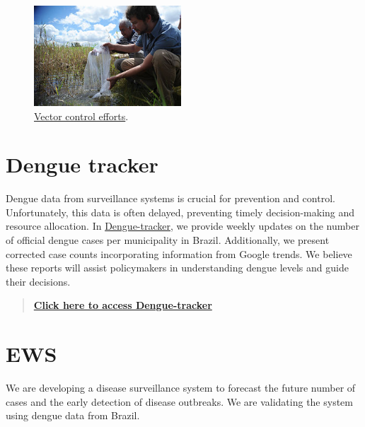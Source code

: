 \documentclass[
  letterpaper,
  DIV=11,
  numbers=noendperiod]{scrreprt}
\begin{document}
\begin{figure}

{\centering \includegraphics[width=0.49\textwidth,height=\textheight]{img/vectorcontrolefforts.jpg}

}

\caption{\label{fig-vectorcontrolefforts}\href{https://en.wikipedia.org/wiki/Dengue_fever\#/media/File:Equipes_usam_t\%C3\%A9cnicas_de_combate_\%C3\%A0_dengue_em_Bras\%C3\%ADlia.jpg}{Vector
control efforts}.}

\end{figure}

\hypertarget{dengue-tracker}{%
\chapter{Dengue tracker}\label{dengue-tracker}}

Dengue data from surveillance systems is crucial for prevention and
control. Unfortunately, this data is often delayed, preventing timely
decision-making and resource allocation. In
\href{https://diseasesurveillance.github.io/dengue-tracker/index.html}{Dengue-tracker},
we provide weekly updates on the number of official dengue cases per
municipality in Brazil. Additionally, we present corrected case counts
incorporating information from Google trends. We believe these reports
will assist policymakers in understanding dengue levels and guide their
decisions.

\begin{quote}
\href{https://diseasesurveillance.github.io/dengue-tracker/index.html}{\textbf{Click
here to access Dengue-tracker}}
\end{quote}

\hypertarget{ews}{%
\chapter{EWS}\label{ews}}

We are developing a disease surveillance system to forecast the future
number of cases and the early detection of disease outbreaks. We are
validating the system using dengue data from Brazil.
\end{document}
